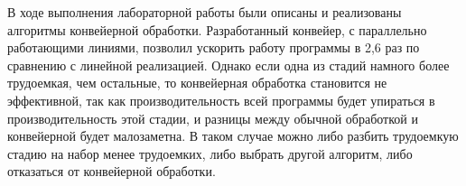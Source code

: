 \Conclusion
    В ходе выполнения лабораторной работы 
    были описаны и реализованы алгоритмы конвейерной обработки.
    Разработанный конвейер, с параллельно работающими линиями,
    позволил ускорить работу программы в 2,6 раз
    по сравнению с линейной реализацией. 
    Однако если одна из стадий намного более трудоемкая, чем остальные,
    то конвейерная обработка становится не эффективной,
    так как производительность всей программы будет упираться в производительность этой стадии,
    и разницы между обычной обработкой и конвейерной будет малозаметна.
    В таком случае можно либо разбить трудоемкую стадию на набор менее трудоемких,
    либо выбрать другой алгоритм, либо отказаться от конвейерной обработки.
